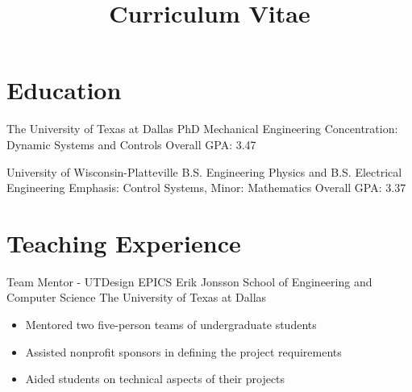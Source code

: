 \documentclass[11pt,letterpaper,roman]{moderncv} %
\title{Curriculum Vitae}
\begin{document}

\makecvtitle %

\vspace{- 1 cm}

\section{Education}

{The University of Texas at Dallas}
{PhD Mechanical Engineering}{}
{Concentration: Dynamic Systems and Controls} 
{Overall GPA: 3.47}

{University of Wisconsin-Platteville}
{B.S. Engineering Physics and  B.S. Electrical Engineering}{}
{Emphasis: Control Systems, Minor: Mathematics} 
{Overall GPA: 3.37}




\section{Teaching Experience}

{Team Mentor - UTDesign EPICS}
{Erik Jonsson School of Engineering and Computer Science}
{The University of Texas at Dallas}
{}
{\begin{itemize}
    \item Mentored two five-person teams of undergraduate students
    \item Assisted nonprofit sponsors in defining the project requirements
    \item Aided students on technical aspects of their projects
\end{itemize}}
\end{document}
